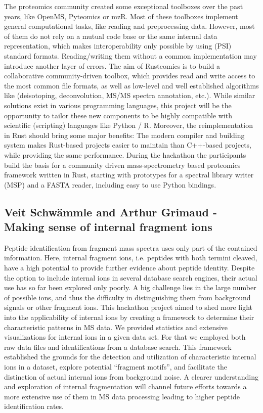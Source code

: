 The proteomics community created some exceptional toolboxes over the past years, like OpenMS, Pyteomics or mzR. Most of these toolboxes implement general computational tasks, like reading and preprocessing data. However, most of them do not rely on a mutual code base or the same internal data representation, which makes interoperability only possible by using (PSI) standard formats. Reading/writing them without a common implementation may introduce another layer of errors.
The aim of Rusteomics is to build a collaborative community-driven toolbox, which provides read and write access to the most common file formats, as well as low-level and well established algorithms like (deisotoping, deconvolution, MS/MS spectra annotation, etc.).
While similar solutions exist in various programming languages, this project will be the opportunity to tailor these new components to be highly compatible with scientific (scripting) languages like Python / R. Moreover, the reimplementation in Rust should bring some major benefits: The modern compiler and building system makes Rust-based projects easier to maintain than C++-based projects, while providing the same performance.
During the hackathon \cite{issue10} the participants build the basis for a community driven mass-spectrometry based proteomics framework written in Rust, starting with prototypes for a spectral library writer (MSP) and a FASTA reader, including easy to use Python bindings.

\subsection{Veit Schwämmle and Arthur Grimaud - Making sense of internal fragment ions}

Peptide identification from fragment mass spectra uses only part of the contained information. Here, internal fragment ions, i.e. peptides with both termini cleaved, have a high potential to provide further evidence about peptide identity. Despite the option to include internal ions in several database search engines, their actual use has so far been explored only poorly. A big challenge lies in the large number of possible ions, and thus the difficulty in distinguishing them from background signals or other fragment ions. This hackathon project \citep{issue9} aimed to shed more light into the applicability of internal ions by creating a framework to determine their characteristic patterns in MS data. We provided statistics and extensive visualizations for internal ions in a given data set. For that we employed both raw data files and identifications from a database search. This framework established the grounds for the detection and utilization of characteristic internal ions in a dataset, explore potential ``fragment motifs'', and facilitate the distinction of actual internal ions from background noise. A clearer understanding and exploration of internal fragmentation will channel future efforts towards a more extensive use of them in MS data processing leading to higher peptide identification rates.


